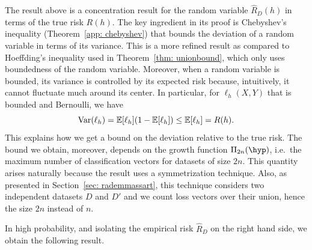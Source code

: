 \documentclass[reqno]{amsart}
\begin{document}
The result above is a concentration result for the random variable $\hat R_D (h)$ in terms of the true risk $R(h)$. The key ingredient in its proof is Chebyshev's inequality (Theorem~\ref{app: chebyshev}) that bounds the deviation of a random variable in terms of its variance. This is a more refined result as compared to Hoeffding's inequality used in Theorem~\ref{thm: unionbound}, which only uses boundedness of the random variable. Moreover, when a random variable is bounded, its variance is controlled by its expected risk because, intuitively, it cannot fluctuate much around its center. In particular, for $\ell_h(X,Y)$ that is bounded and Bernoulli, we have
\[
\operatorname{Var}(\ell_h) = \mathbb{E}[\ell_h](1-\mathbb{E}[\ell_h])\le \mathbb{E}[\ell_h] = R(h).
\]
This explains how we get a bound on the deviation relative to the true risk. 
The bound we obtain, moreover, depends on the growth function $\Pi_{2n}(\hyp)$, i.e.\ the maximum number of classification vectors for datasets of size $2n$. This quantity arises naturally because the result uses a symmetrization technique. Also, as presented in Section~\ref{sec: rademmassart}, this technique considers two independent datasets $D$ and $D'$ and we count loss vectors over their union, hence the size $2n$ instead of $n$. 

In high probability, and isolating the empirical risk $\hat R_D$ on the right hand side, we obtain the following result. 
\end{document}
